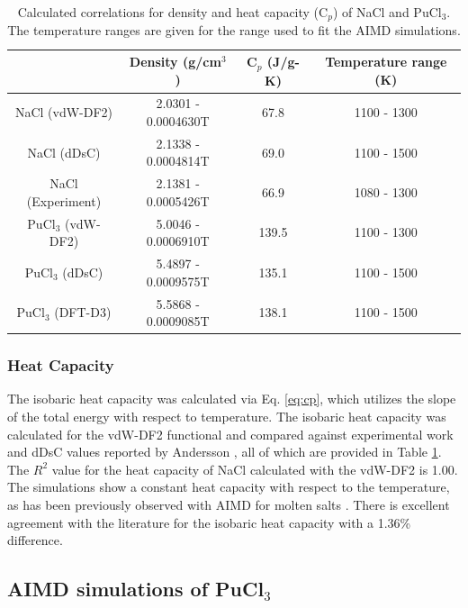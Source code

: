 \documentclass[review]{elsarticle}
\begin{document}
\begin{table}[h!]
\caption{Calculated correlations for density and heat capacity (C$_p$) of NaCl and PuCl$_3$. The temperature ranges are given for the range used to fit the AIMD simulations.}
\centering
\begin{tabular}{|c|c|c|c|}
\hline
                      & Density (g/cm$^{3}$) & C$_p$ (J/g-K)   & Temperature range (K)     \\
\hline
NaCl (vdW-DF2)        &  2.0301 - 0.0004630T             & 67.8 &  1100 - 1300  \\
NaCl (dDsC) \cite{ANDERSSON2022153836}        &  2.1338 - 0.0004814T                     & 69.0 &  1100  - 1500  \\
NaCl (Experiment)      & 2.1381 - 0.0005426T  \cite{janz1988thermodynamic}         &66.9 \cite{nist_ref}    & 1080 - 1300 \cite{janz1988thermodynamic} \\
PuCl$_{3}$ (vdW-DF2) &   5.0046 - 0.0006910T                   & 139.5 &    1100 - 1300 \\
PuCl$_{3}$ (dDsC)    &   5.4897 - 0.0009575T                   & 135.1 &    1100 - 1500   \\
PuCl$_3$ (DFT-D3)       &    5.5868 - 0.0009085T                  & 138.1 &   1100 - 1500 \\
\hline 
\end{tabular}
\label{table:rho_cp_correlation}
\end{table}

\subsubsection{Heat Capacity}
The isobaric heat capacity was calculated via Eq. \ref{eq:cp}, which utilizes the slope of the total energy with respect to temperature. The isobaric heat capacity was calculated for the vdW-DF2 functional and compared against experimental work \cite{nist_ref} and dDsC values reported by Andersson \cite{ANDERSSON2022153836}, all of which are provided in Table \ref{table:rho_cp_correlation}. The $R^2$ value for the heat capacity of NaCl calculated with the vdW-DF2 is 1.00. The simulations show a constant heat capacity with respect to the temperature, as has been previously observed with AIMD for molten salts \cite{duemmler_naclmgcl, karlsson2022synthesis, yuan2019specific, redkin2015heat}. There is excellent agreement with the literature for the isobaric heat capacity with a 1.36\% difference. 

\subsection{AIMD simulations of PuCl$_3$}
\end{document}
